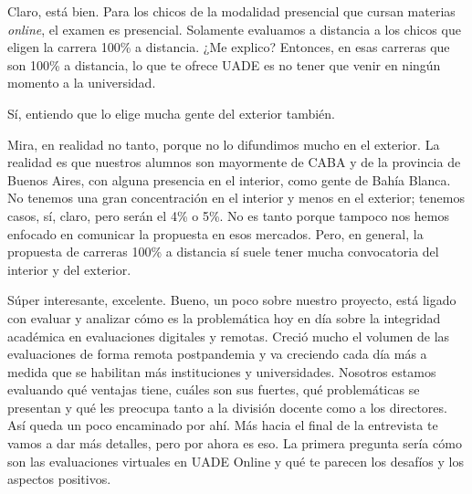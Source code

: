 \begin{description}[leftmargin=0cm, labelsep=0.5cm, style=nextline]
\item[\textbf{Entrevistado:}] Claro, está bien. Para los chicos de la modalidad presencial que cursan materias \textit{online}, el examen es presencial. Solamente evaluamos a distancia a los chicos que eligen la carrera 100\% a distancia. ¿Me explico? Entonces, en esas carreras que son 100\% a distancia, lo que te ofrece UADE es no tener que venir en ningún momento a la universidad.
\item[\textbf{Entrevistador:}] Sí, entiendo que lo elige mucha gente del exterior también.
\item[\textbf{Entrevistado:}] Mira, en realidad no tanto, porque no lo difundimos mucho en el exterior. La realidad es que nuestros alumnos son mayormente de CABA y de la provincia de Buenos Aires, con alguna presencia en el interior, como gente de Bahía Blanca. No tenemos una gran concentración en el interior y menos en el exterior; tenemos casos, sí, claro, pero serán el 4\% o 5\%. No es tanto porque tampoco nos hemos enfocado en comunicar la propuesta en esos mercados. Pero, en general, la propuesta de carreras 100\% a distancia sí suele tener mucha convocatoria del interior y del exterior.
\item[\textbf{Entrevistador:}] Súper interesante, excelente. Bueno, un poco sobre nuestro proyecto, está ligado con evaluar y analizar cómo es la problemática hoy en día sobre la integridad académica en evaluaciones digitales y remotas. Creció mucho el volumen de las evaluaciones de forma remota postpandemia y va creciendo cada día más a medida que se habilitan más instituciones y universidades. Nosotros estamos evaluando qué ventajas tiene, cuáles son sus fuertes, qué problemáticas se presentan y qué les preocupa tanto a la división docente como a los directores. Así queda un poco encaminado por ahí. Más hacia el final de la entrevista te vamos a dar más detalles, pero por ahora es eso. La primera pregunta sería cómo son las evaluaciones virtuales en UADE Online y qué te parecen los desafíos y los aspectos positivos.

\end{description}
